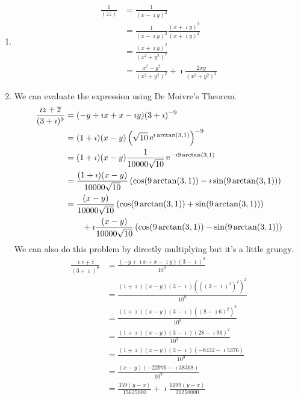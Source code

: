 {\begin{Solution}
\begin{enumerate}
  \item
    \begin{align*}
      \frac{1}{ \left( \overline{z} \overline{z} \right) }
      &= \frac{1}{ (x - \imath y)^2 }
      \\
      &= \frac{1}{ (x - \imath y)^2 }  \frac{ (x + \imath y)^2 }{ (x + \imath y)^2 }
      \\
      &= \frac{ (x + \imath y)^2 }{ (x^2 + y^2)^2 }
      \\
      &= \frac{ x^2 - y^2 }{ (x^2 + y^2)^2 }
      + \imath \frac{ 2 x y }{ (x^2 + y^2)^2 }
    \end{align*}
  \item
    We can evaluate the expression using De Moivre'{}s Theorem.
    \begin{align*}
      \frac{ \imath z + \overline{z} }{ (3 + \imath)^9 }
      &= (-y + \imath x + x - \imath y) (3 + \imath)^{-9}
      \\
      &= (1 + \imath) (x - y) \left( \sqrt{10} \mathop{\mathrm{e}}\nolimits^{\imath \arctan(3,1)} \right)^{-9}
      \\
      &= (1 + \imath) (x - y) \frac{1}{10000 \sqrt{10}} \mathop{\mathrm{e}}\nolimits^{-\imath 9 \arctan(3,1)}
      \\
      &= \frac{ (1 + \imath) (x - y) }{ 10000 \sqrt{10} } 
      \left( \cos(9 \arctan(3,1)) - \imath \sin(9 \arctan(3,1)) \right)
      \\
      &= \frac{(x - y)}{10000 \sqrt{10}} \left( \cos(9 \arctan(3,1))
        + \sin(9 \arctan(3,1)) \right)
      \\
      &\qquad+ \imath \frac{(x - y)}{10000 \sqrt{10}} \left( \cos(9 \arctan(3,1))
        - \sin(9 \arctan(3,1)) \right)
    \end{align*}
    We can also do this problem by directly multiplying but it's a 
    little grungy.
    \begin{align*}
      \frac{ \imath z + \overline{z} }{ (3 + \imath)^9 }
      &= \frac{ (-y + \imath x + x - \imath y) (3 - \imath)^9 }{ 10^9 }
      \\
      &= \frac{ (1 + \imath) (x - y) (3 - \imath) \left( \left( (3 - \imath)^2 \right)^2 
        \right)^2}{ 10^9 }
      \\
      &= \frac{ (1 + \imath) (x - y) (3 - \imath) \left( \left( 8 - \imath 6 \right)^2 
        \right)^2}{ 10^9 }
      \\
      &= \frac{ (1 + \imath) (x - y) (3 - \imath) ( 28 - \imath 96 )^2}{ 10^9 }
      \\
      &= \frac{ (1 + \imath) (x - y) (3 - \imath) ( -8432 - \imath 5376)}{ 10^9 }
      \\
      &= \frac{ (x - y) (-22976 - \imath 38368) }{ 10^9 }
      \\
      &= \frac{ 359 (y - x) }{ 15625000 } + \imath \frac{ 1199 (y-x) }{ 31250000 }
    \end{align*}
  \end{enumerate}
\end{Solution}







}

